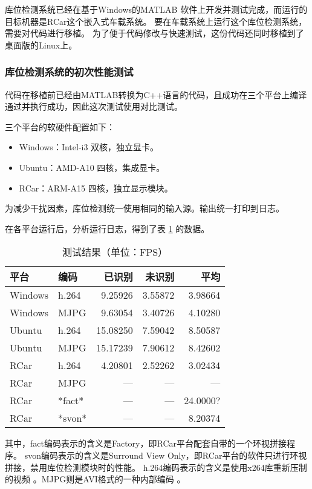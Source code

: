 库位检测系统已经在基于Windows的MATLAB \cite{matlab} 软件上开发并测试完成，而运行的目标机器是RCar这个嵌入式车载系统。
要在车载系统上运行这个库位检测系统，需要对代码进行移植。
为了便于代码修改与快速测试，这份代码还同时移植到了桌面版的Linux上。

\subsubsection{库位检测系统的初次性能测试}
代码在移植前已经由MATLAB转换为C++语言的代码，且成功在三个平台上编译通过并执行成功，因此这次测试使用对比测试。

三个平台的软硬件配置如下：

{
\begin{itemize}
    \addtolength{\itemindent}{2.5em}
    \item Windows：Intel-i3 双核，独立显卡。
    \item Ubuntu：AMD-A10 四核，集成显卡。
    \item RCar：ARM-A15 四核，独立显示模块。
\end{itemize}
}

为减少干扰因素，库位检测统一使用相同的输入源。输出统一打印到日志。

在各平台运行后，分析运行日志，得到了表 \ref{tab:bench} 的数据。

\begin{table}[!hbt]
\centering
\caption{测试结果（单位：FPS）} \label{tab:bench}
\renewcommand{\arraystretch}{1.6}
\begin{tabular}{llrrr}
\hline 平台 & 编码 & 已识别 & 未识别 & 平均 \\ \hline
Windows & h.264 &  9.25926 & 3.55872 & 3.98664 \\
Windows & MJPG &  9.63054 & 3.40726 & 4.10280 \\
Ubuntu  & h.264 & 15.08250 & 7.59042 & 8.50587 \\
Ubuntu  & MJPG & 15.17239 & 7.90612 & 8.42602 \\
RCar    & h.264 &  4.20801 & 2.52262 & 3.02434 \\
RCar    & MJPG & --- & --- & --- \\
RCar    & *fact* & --- & --- & 24.0000? \\
RCar    & *svon* & --- & --- & 8.20374 \\
\hline
\end{tabular}
\end{table}

其中，fact编码表示的含义是Factory，即RCar平台配套自带的一个环视拼接程序。
svon编码表示的含义是Surround View Only，即RCar平台的软件只进行环视拼接，禁用库位检测模块时的性能。
h.264编码表示的含义是使用x264库重新压制的视频 \cite{h264}。MJPG则是AVI格式的一种内部编码 \cite{mjpg}。

